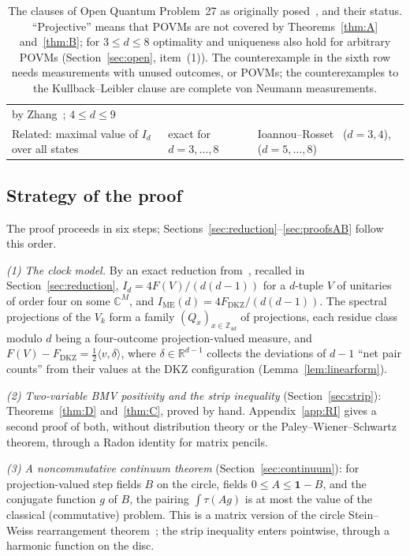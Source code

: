 \documentclass[11pt]{amsart}
\theoremstyle{definition}
\theoremstyle{remark}
\numberwithin{equation}{section}
\newcommand{\Z}{\mathbb{Z}}
\newcommand{\R}{\mathbb{R}}
\newcommand{\C}{\mathbb{C}}
\newcommand{\FD}{F_{\mathrm{DKZ}}}
\newcommand{\IME}{I_{\mathrm{ME}}}
\newcommand{\one}{\mathbf{1}}
\newcommand{\ip}[2]{\langle #1,#2\rangle}
\begin{document}
\begin{table}[ht]
\begin{tabular}{@{}>{\raggedright\arraybackslash}p{}>{\raggedright\arraybackslash}p{}>{\raggedright\arraybackslash}p{}@{}}
by Zhang~\cite{Zhang}; $4\le d\le9$~\cite{repo-cglmp}\\
Related: maximal value of $I_d$ over all states & exact for $d=3,\dots,8$ & Ioannou--Rosset~\cite{IR} ($d=3,4$),
\cite{repo-cglmp} ($d=5,\dots,8$)\\
\bottomrule
\end{tabular}
\caption{The clauses of Open Quantum Problem~27 as originally posed~\cite{OQP}, and their status. ``Projective'' means
that POVMs are not covered by Theorems~\ref{thm:A} and~\ref{thm:B}; for $3\le d\le8$ optimality and uniqueness also hold for
arbitrary POVMs (Section~\ref{sec:open}, item~(1)). The counterexample in the sixth row needs measurements with unused
outcomes, or POVMs; the counterexamples to the Kullback--Leibler clause are complete von Neumann
measurements.}\label{tab:status}
\end{table}

\subsection{Strategy of the proof}\label{subsec:strategy}
The proof proceeds in six steps; Sections~\ref{sec:reduction}--\ref{sec:proofsAB} follow this order.

\emph{(1) The clock model.} By an exact reduction from~\cite{MS-classical}, recalled in Section~\ref{sec:reduction},
$I_d=4F(V)/(d(d-1))$ for a $d$-tuple $V$ of unitaries of order four on some $\C^M$, and $\IME(d)=4\FD/(d(d-1))$. The
spectral projections of the $V_k$ form a family $(Q_x)_{x\in\Z_{4d}}$ of projections, each residue class modulo $d$
being a four-outcome projection-valued measure, and $F(V)-\FD=\frac12\ip v\delta$, where $\delta\in\R^{d-1}$ collects
the deviations of $d-1$ ``net pair counts'' from their values at the DKZ configuration (Lemma~\ref{lem:linearform}).

\emph{(2) Two-variable BMV positivity and the strip inequality} (Section~\ref{sec:strip}): Theorems~\ref{thm:D}
and~\ref{thm:C}, proved by hand. Appendix~\ref{app:RI} gives a second proof of both, without distribution theory or
the Paley--Wiener--Schwartz theorem, through a Radon identity for matrix pencils.

\emph{(3) A noncommutative continuum theorem} (Section~\ref{sec:continuum}): for projection-valued step fields $B$ on
the circle, fields $0\le A\le\one-B$, and the conjugate function $g$ of $B$, the pairing $\int\tau(Ag)$ is at most
the value of the classical (commutative) problem. This is a matrix version of the circle Stein--Weiss
rearrangement theorem~\cite{SW,Laeng}; the strip inequality enters pointwise, through a harmonic function on the disc.
\end{document}
